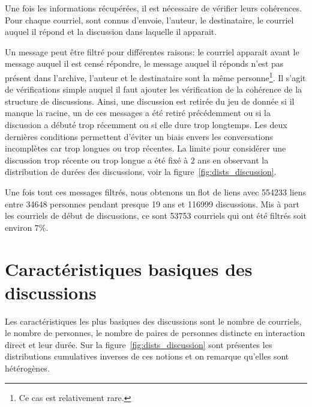 Une fois les informations récupérées, il est nécessaire de vérifier leurs cohérences.
Pour chaque courriel, sont connus d'envoie, l'auteur, le destinataire, le courriel auquel il répond et la discussion dans laquelle il apparait.

Un message peut être filtré pour différentes raisons: le courriel apparait avant le message auquel il est censé répondre, le message auquel il réponds n'est pas présent dans l'archive, l'auteur et le destinataire sont la même personne\footnote{Ce cas est relativement rare.}.
Il s'agit de vérifications simple auquel il faut ajouter les vérification de la cohérence de la structure de discussions.
Ainsi, une discussion est retirée du jeu de donnée si il manque la racine, un de ces messages a été retiré précédemment ou si la discussion a débuté trop récemment ou si elle dure trop longtemps.
Les deux dernières conditions permettent d'éviter un biais envers les conversations incomplètes car trop longues ou trop récentes.
La limite pour considérer une discussion trop récente ou trop longue a été fixé à 2 ans en observant la distribution de durées des discussions, voir la figure~\ref{fig:dists_discussion}.

Une fois tout ces messages filtrés, nous obtenons un flot de liens avec 554233 liens entre 34648 personnes pendant presque 19 ans et 116999 discussions.
Mis à part les courriels de début de discussions, ce sont 53753 courriels qui ont été filtrés soit environ $7\%$.

\section{Caractéristiques basiques des discussions}

Les caractéristiques les plus basiques des discussions sont le nombre de courriels, le nombre de personnes, le nombre de paires de personnes distincte en interaction direct et leur durée.
Sur la figure~\ref{fig:dists_discussion} sont présentes les distributions cumulatives inverses de ces notions et on remarque qu'elles sont hétérogènes.

